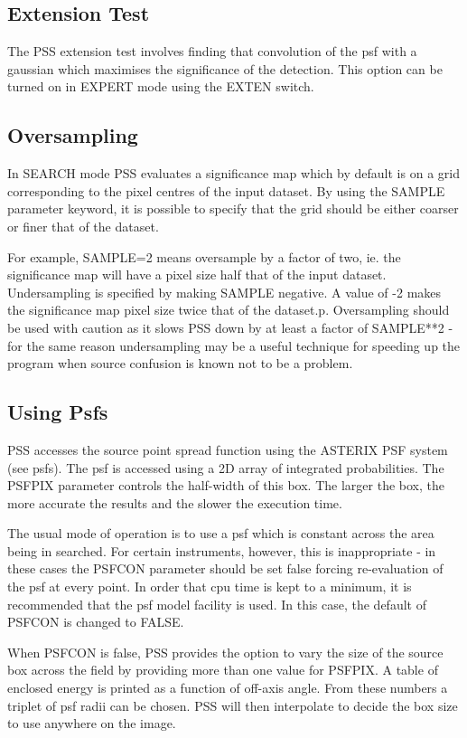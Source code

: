 \documentclass{book}
\renewcommand{\_}{{\tt\char'137}}     %
\begin{document}
\subsection{Extension Test}
The PSS extension test involves finding that convolution of the psf
with a gaussian which maximises the significance of the detection.
This option can be turned on in EXPERT mode using the EXTEN switch.

\subsection{Oversampling}
In SEARCH mode PSS evaluates a significance map which by default is
on a grid corresponding to the pixel centres of the input dataset.
By using the SAMPLE parameter keyword, it is possible to specify
that the grid should be either coarser or finer that of the dataset.

For example, SAMPLE=2 means oversample by a factor of two, ie. the
significance map will have a pixel size half that of the input
dataset. Undersampling is specified by making SAMPLE negative. A
value of -2 makes the significance map pixel size twice that of
the dataset.p.
Oversampling should be used with caution as it slows PSS down by at
least a factor of SAMPLE**2 - for the same reason undersampling may
be a useful technique for speeding up the program when source
confusion is known not to be a problem.

\subsection{Using Psfs}
PSS accesses the source point spread function using the ASTERIX PSF
system (see psfs). The psf is accessed using a 2D array of
integrated probabilities. The PSFPIX parameter controls the half-width
of this box. The larger the box, the more accurate the results and
the slower the execution time.

The usual mode of operation is to use a psf which is constant across
the area being in searched. For certain instruments, however, this
is inappropriate - in these cases the PSFCON parameter should be set
false forcing re-evaluation of the psf at every point. In order that
cpu time is kept to a minimum, it is recommended that the psf model
facility is used. In this case, the default of PSFCON is changed to
FALSE.

When PSFCON is false, PSS provides the option to vary the size of
the source box across the field by providing more than one value
for PSFPIX. A table of enclosed energy is printed as a function of
off-axis angle. From these numbers a triplet of psf radii can be
chosen. PSS will then interpolate to decide the box size to use
anywhere on the image.
\end{document}
